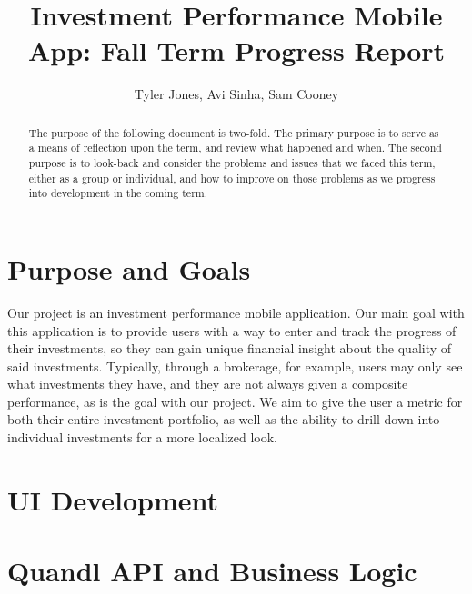 \documentclass[letterpaper,10pt,titlepage,journal,compsoc,draftclsnofoot,onecolumn]{IEEEtran}
\title{Investment Performance Mobile App: Fall Term Progress Report}
\author{Tyler Jones, Avi Sinha, Sam Cooney}
\newcommand\tab[1][1cm]{\hspace*{#1}}
\begin{document}
\begin{titlingpage}
    \maketitle
	\centering{}
    \begin{abstract}
        
     The purpose of the following document is two-fold. The primary purpose is to serve as a means of reflection upon the term, and review what happened and when. The second purpose is to look-back and consider the problems and issues that we faced this term, either as a group or individual, and how to improve on those problems as we progress into development in the coming term.
        
    \end{abstract}
\end{titlingpage}

\newpage

\tableofcontents{}

\newpage

\section{Purpose and Goals}

\tab Our project is an investment performance mobile application. Our main goal with this application is to provide users with a way to enter and track the progress of their investments, so they can gain unique financial insight about the quality of said investments. Typically, through a brokerage, for example, users may only see what investments they have, and they are not always given a composite performance, as is the goal with our project. We aim to give the user a metric for both their entire investment portfolio, as well as the ability to drill down into individual investments for a more localized look.

\section{UI Development}

    
\section{Quandl API and Business Logic}
\end{document}
